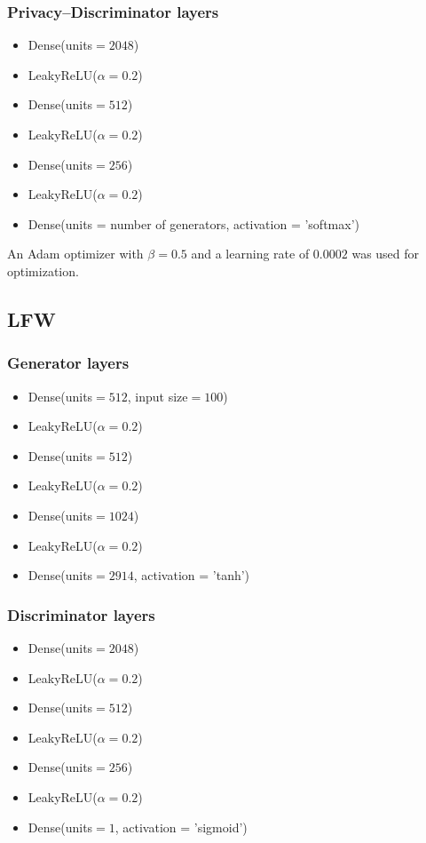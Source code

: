 \documentclass{article}
\begin{document}
\subsubsection*{Privacy--Discriminator layers}
\begin{itemize}
\itemsep0em
    \item Dense(units$=2048$)
    \item LeakyReLU($\alpha=0.2$)
    \item Dense(units$=512$)
    \item LeakyReLU($\alpha=0.2$)
    \item Dense(units$=256$)
    \item LeakyReLU($\alpha=0.2$)
    \item Dense(units = number of generators, activation = 'softmax')
\end{itemize}

An Adam optimizer with $\beta = 0.5$ and a learning rate of $0.0002$ was used for optimization.

\subsection*{LFW}
\subsubsection*{Generator layers}
\begin{itemize}
\itemsep0em
    \item Dense(units$=512$, input size$=100$)
    \item LeakyReLU($\alpha=0.2$)
    \item Dense(units$=512$)
    \item LeakyReLU($\alpha=0.2$)
    \item Dense(units$=1024$)
    \item LeakyReLU($\alpha=0.2$)
    \item Dense(units$=2914$, activation = 'tanh')
\end{itemize}

\subsubsection*{Discriminator layers}
\begin{itemize}
\itemsep0em
    \item Dense(units$=2048$)
    \item LeakyReLU($\alpha=0.2$)
    \item Dense(units$=512$)
    \item LeakyReLU($\alpha=0.2$)
    \item Dense(units$=256$)
    \item LeakyReLU($\alpha=0.2$)
    \item Dense(units$=1$, activation = 'sigmoid')
\end{itemize}
\end{document}
